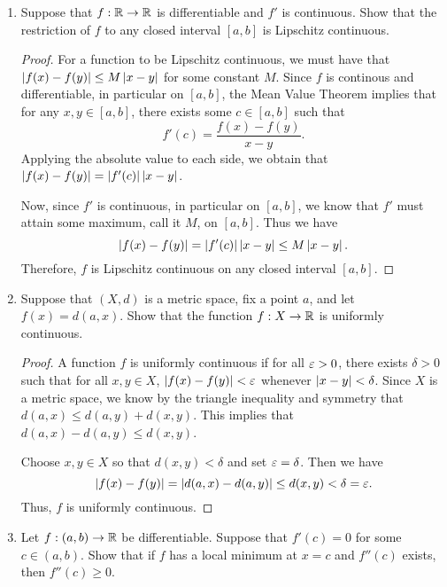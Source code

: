 \documentclass[12pt]{article}
\theoremstyle{plain}
\begin{document}
\begin{enumerate}
    \item Suppose that $f:\mathbb{R} \rightarrow \mathbb{R}$ is differentiable and $f'$ is continuous.
    Show that the restriction of $f$ to any closed interval $[a,b]$ is Lipschitz continuous.

    \begin{proof}
        For a function to be Lipschitz continuous, we must have that $\left| f(x)-f(y) \right| \leq M\left| x-y \right|$ for some constant $M$.
        Since $f$ is continous and differentiable, in particular on $[a,b]$, the Mean Value Theorem implies that for any $x,y\in [a,b]$, there exists some $c\in [a,b]$ such that
        \[
            f'(c) = \frac{f(x)-f(y)}{x-y}.
        \]
        Applying the absolute value to each side, we obtain that $\left| f(x)-f(y) \right| = \left| f'(c) \right|\left| x-y \right|$.

        Now, since $f'$ is continuous, in particular on $[a,b]$, we know that $f'$ must attain some maximum, call it $M$, on $[a,b]$.
        Thus we have
        \[
            \left| f(x)-f(y) \right| = \left| f'(c) \right|\left| x-y \right| \leq M\left| x-y \right|.
        \]
        Therefore, $f$ is Lipschitz continuous on any closed interval $[a,b]$.
    \end{proof}

    \newpage\item Suppose that $(X,d)$ is a metric space, fix a point $a$, and let $f(x) = d(a,x)$.
    Show that the function $f: X \rightarrow \mathbb{R}$ is uniformly continuous.

    \begin{proof}
        A function $f$ is uniformly continuous if for all $\varepsilon > 0$, there exists $\delta >0$ such that for all $x,y\in X$, $\left| f(x)-f(y) \right| < \varepsilon$ whenever $\left| x-y \right| < \delta$.
        Since $X$ is a metric space, we know by the triangle inequality and symmetry that $d(a,x) \leq d(a,y) + d(x,y)$.
        This implies that $d(a,x)-d(a,y) \leq d(x,y)$.
        
        Choose $x,y\in X$ so that $d(x,y) < \delta$ and set $\varepsilon = \delta$. 
        Then we have
        \[
            \left| f(x) - f(y) \right| = \left| d(a,x)-d(a,y) \right| \leq d(x,y) < \delta = \varepsilon.
        \]
        Thus, $f$ is uniformly continuous.
    \end{proof}

    \newpage\item Let $f:(a,b) \to \mathbb{R}$ be differentiable.
    Suppose that $f'(c) = 0$ for some $c\in (a,b)$.
    Show that if $f$ has a local minimum at $x=c$ and $f''(c)$ exists, then $f''(c) \geq 0$.


\end{enumerate}
\end{document}
